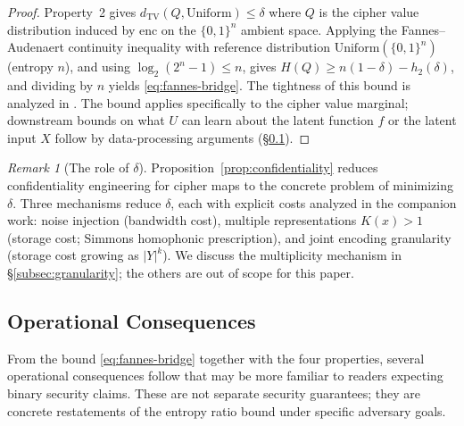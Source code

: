 \documentclass[11pt]{article}
\theoremstyle{definition}
\theoremstyle{plain}
\theoremstyle{remark}
\newtheorem{remark}{Remark}[section]
\newcommand{\enc}{\mathrm{enc}}
\newcommand{\TV}{d_{\mathrm{TV}}}
\newcommand{\B}{\{0,1\}}
\begin{document}
\begin{proof}
Property~2 gives $\TV(Q, \mathrm{Uniform}) \leq \delta$ where $Q$ is the
cipher value distribution induced by $\enc$ on the $\B^n$ ambient space.
Applying the Fannes--Audenaert continuity inequality with reference
distribution $\mathrm{Uniform}(\B^n)$ (entropy $n$), and using
$\log_2(2^n - 1) \le n$, gives
$H(Q) \geq n(1 - \delta) - h_2(\delta)$, and dividing by $n$ yields
\eqref{eq:fannes-bridge}.  The tightness of this bound is analyzed in
\cite[Theorem~4.1, part~3]{towell2026maxconf}.  The bound applies
specifically to the cipher value marginal; downstream bounds on what
$U$ can learn about the latent function $f$ or the latent input $X$
follow by data-processing arguments
(\S\ref{subsec:operational}).
\end{proof}

\begin{remark}[The role of $\delta$]
\label{rem:delta-role}
Proposition~\ref{prop:confidentiality} reduces confidentiality engineering
for cipher maps to the concrete problem of minimizing $\delta$.  Three
mechanisms reduce $\delta$, each with explicit costs analyzed in the
companion work: noise injection (bandwidth cost), multiple representations
$K(x) > 1$ (storage cost; Simmons homophonic prescription), and joint
encoding granularity (storage cost growing as $|Y|^k$).  We discuss the
multiplicity mechanism in \S\ref{subsec:granularity}; the others are out
of scope for this paper.
\end{remark}

\subsection{Operational Consequences}
\label{subsec:operational}

From the bound \eqref{eq:fannes-bridge} together with the four properties,
several operational consequences follow that may be more familiar to
readers expecting binary security claims.  These are not separate
security guarantees; they are concrete restatements of the entropy ratio
bound under specific adversary goals.
\end{document}
